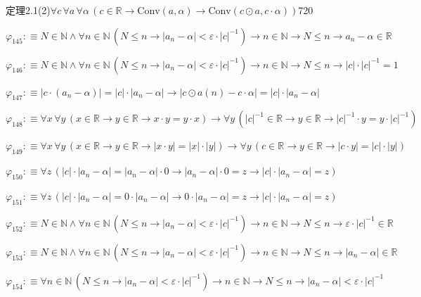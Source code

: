 \begin{fullproof}{定理2.1(2)}{$\forall c\,\forall a\,\forall \alpha\,(c \in \mathbb{R} \to \mathrm{Conv}(a,\alpha) \to \mathrm{Conv}(c \odot a,c \cdot \alpha))$}{720}
\begin{abbrevlist}
\item $\varphi_{145} :\equiv N \in \mathbb{N} \land \forall n \in \mathbb{N}\,(N \leq n \to \lvert a_{n} - \alpha \rvert < \varepsilon \cdot \lvert c \rvert^{-1}) \to n \in \mathbb{N} \to N \leq n \to a_{n} - \alpha \in \mathbb{R}$
\item $\varphi_{146} :\equiv N \in \mathbb{N} \land \forall n \in \mathbb{N}\,(N \leq n \to \lvert a_{n} - \alpha \rvert < \varepsilon \cdot \lvert c \rvert^{-1}) \to n \in \mathbb{N} \to N \leq n \to \lvert c \rvert \cdot \lvert c \rvert^{-1} = 1$
\item $\varphi_{147} :\equiv \lvert c \cdot (a_{n} - \alpha) \rvert = \lvert c \rvert \cdot \lvert a_{n} - \alpha \rvert \to \lvert c \odot a(n) - c \cdot \alpha \rvert = \lvert c \rvert \cdot \lvert a_{n} - \alpha \rvert$
\item $\varphi_{148} :\equiv \forall x\,\forall y\,(x \in \mathbb{R} \to y \in \mathbb{R} \to x \cdot y = y \cdot x) \to \forall y\,(\lvert c \rvert^{-1} \in \mathbb{R} \to y \in \mathbb{R} \to \lvert c \rvert^{-1} \cdot y = y \cdot \lvert c \rvert^{-1})$
\item $\varphi_{149} :\equiv \forall x\,\forall y\,(x \in \mathbb{R} \to y \in \mathbb{R} \to \lvert x \cdot y \rvert = \lvert x \rvert \cdot \lvert y \rvert) \to \forall y\,(c \in \mathbb{R} \to y \in \mathbb{R} \to \lvert c \cdot y \rvert = \lvert c \rvert \cdot \lvert y \rvert)$
\item $\varphi_{150} :\equiv \forall z\,(\lvert c \rvert \cdot \lvert a_{n} - \alpha \rvert = \lvert a_{n} - \alpha \rvert \cdot 0 \to \lvert a_{n} - \alpha \rvert \cdot 0 = z \to \lvert c \rvert \cdot \lvert a_{n} - \alpha \rvert = z)$
\item $\varphi_{151} :\equiv \forall z\,(\lvert c \rvert \cdot \lvert a_{n} - \alpha \rvert = 0 \cdot \lvert a_{n} - \alpha \rvert \to 0 \cdot \lvert a_{n} - \alpha \rvert = z \to \lvert c \rvert \cdot \lvert a_{n} - \alpha \rvert = z)$
\item $\varphi_{152} :\equiv N \in \mathbb{N} \land \forall n \in \mathbb{N}\,(N \leq n \to \lvert a_{n} - \alpha \rvert < \varepsilon \cdot \lvert c \rvert^{-1}) \to n \in \mathbb{N} \to N \leq n \to \varepsilon \cdot \lvert c \rvert^{-1} \in \mathbb{R}$
\item $\varphi_{153} :\equiv N \in \mathbb{N} \land \forall n \in \mathbb{N}\,(N \leq n \to \lvert a_{n} - \alpha \rvert < \varepsilon \cdot \lvert c \rvert^{-1}) \to n \in \mathbb{N} \to N \leq n \to \lvert a_{n} - \alpha \rvert \in \mathbb{R}$
\item $\varphi_{154} :\equiv \forall n \in \mathbb{N}\,(N \leq n \to \lvert a_{n} - \alpha \rvert < \varepsilon \cdot \lvert c \rvert^{-1}) \to n \in \mathbb{N} \to N \leq n \to \lvert a_{n} - \alpha \rvert < \varepsilon \cdot \lvert c \rvert^{-1}$

\end{abbrevlist}
\end{fullproof}
